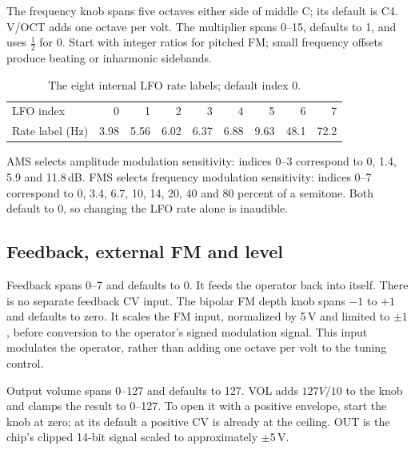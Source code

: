 The frequency knob spans five octaves either side of middle C; its default
is C4. V/OCT adds one octave per volt. The multiplier spans 0--15, defaults
to 1, and uses $\tfrac12$ for 0. Start with integer ratios for pitched FM;
small frequency offsets produce beating or inharmonic sidebands.

\begin{table}[ht]
\centering\small
\begin{tabular}{@{}lrrrrrrrr@{}}
\toprule LFO index & 0 & 1 & 2 & 3 & 4 & 5 & 6 & 7 \\
Rate label (Hz) & 3.98 & 5.56 & 6.02 & 6.37 & 6.88 & 9.63 & 48.1 & 72.2 \\
\bottomrule
\end{tabular}
\caption{The eight internal LFO rate labels; default index 0.}
\label{tab:lfo-frequencies}
\end{table}

AMS selects amplitude modulation sensitivity: indices 0--3 correspond to
0, 1.4, 5.9 and 11.8\,dB. FMS selects frequency modulation sensitivity:
indices 0--7 correspond to 0, 3.4, 6.7, 10, 14, 20, 40 and 80 percent of a
semitone. Both default to 0, so changing the LFO rate alone is inaudible.

\subsection{Feedback, external FM and level}
Feedback spans 0--7 and defaults to 0. It feeds the operator back into
itself. There is no separate feedback CV input. The bipolar FM depth knob
spans $-1$ to $+1$ and defaults to zero. It scales the FM input, normalized
by 5\,V and limited to $\pm1$, before conversion to the operator's signed
modulation signal. This input modulates the operator, rather than adding
one octave per volt to the tuning control.

Output volume spans 0--127 and defaults to 127. VOL adds $127V/10$ to the
knob and clamps the result to 0--127. To open it with a positive envelope,
start the knob at zero; at its default a positive CV is already at the ceiling.
OUT is the chip's clipped 14-bit signal scaled to approximately $\pm5$\,V.
